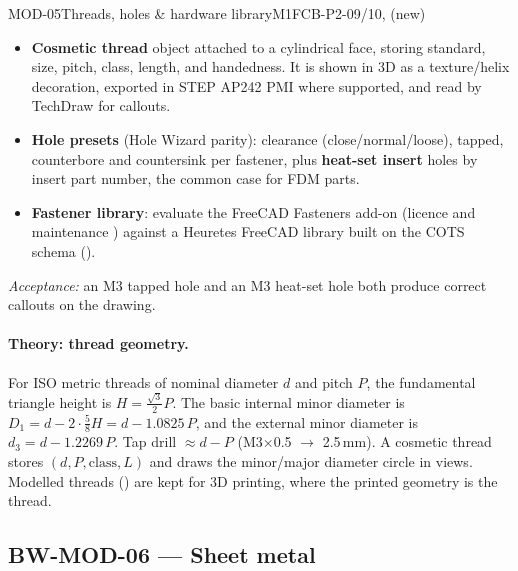 \begin{epic}{MOD-05}{Threads, holes \& hardware library}{M1}{\stDone}{FCB-P2-09/10, (new)}
\begin{itemize}
  \item \textbf{Cosmetic thread} object attached to a cylindrical face, storing standard, size, pitch,
        class, length, and handedness. It is shown in 3D as a texture/helix decoration, exported in STEP
        AP242 PMI where supported, and read by TechDraw for callouts.
  \item \textbf{Hole presets} (Hole Wizard parity): clearance (close/normal/loose), tapped, counterbore
        and countersink per fastener, plus \textbf{heat-set insert} holes by insert part number, the common
        case for FDM parts.
  \item \textbf{Fastener library}: evaluate the FreeCAD Fasteners add-on (licence and maintenance
        \verify) against a Heuretes FreeCAD library built on the COTS schema ().
\end{itemize}
\emph{Acceptance:} an M3 tapped hole and an M3 heat-set hole both produce correct callouts on the drawing.
\end{epic}

\paragraph{Theory: thread geometry.} For ISO metric threads of nominal diameter $d$ and pitch $P$, the
fundamental triangle height is $H=\tfrac{\sqrt3}{2}P$. The basic internal minor diameter is
$D_1=d-2\cdot\tfrac{5}{8}H = d-1.0825\,P$, and the external minor diameter is $d_3=d-1.2269\,P$. Tap drill
$\approx d-P$ (M3$\times$0.5 $\rightarrow$ 2.5\,mm). A cosmetic thread stores $(d,P,\text{class},L)$ and draws
the minor/major diameter circle in views. Modelled threads () are kept for 3D printing,
where the printed geometry is the thread.



\subsection{BW-MOD-06 --- Sheet metal}

